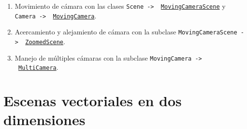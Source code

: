 \documentclass[a4paper]{article}
\begin{document}
\begin{enumerate}

    \item Movimiento de cámara con las clases \texttt{Scene -> \ \href{https://docs.manim.community/en/v0.16.0.post0/reference/manim.scene.moving_camera_scene.MovingCameraScene.html?highlight=MovingCameraScene}{MovingCameraScene}} y \texttt{Camera -> \ \href{https://docs.manim.community/en/v0.16.0.post0/reference/manim.camera.moving_camera.MovingCamera.html?highlight=MovingCamera}{MovingCamera}}.

    \item Acercamiento y alejamiento de cámara con la subclase \texttt{MovingCameraScene -> \ \href{https://docs.manim.community/en/v0.16.0.post0/reference/manim.scene.zoomed_scene.ZoomedScene.html?highlight=ZoomedScene}{ZoomedScene}}.

    \item Manejo de múltiples cámaras con la subclase \texttt{MovingCamera -> \ \href{https://docs.manim.community/en/v0.16.0.post0/reference/manim.camera.multi_camera.MultiCamera.html?highlight=MultiCamera}{MultiCamera}}.
\end{enumerate}

\section{Escenas vectoriales en dos dimensiones} \label{Sec: Escenas vectoriales en dos dimensiones}
\end{document}
